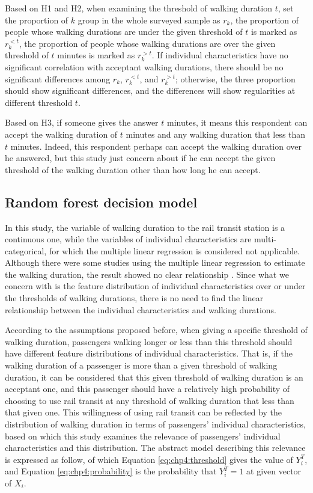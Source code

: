 Based on H1 and H2, when examining the threshold of walking duration $t$, set the proportion of $k$ group in the whole surveyed sample as $r_k$, the proportion of people whose walking durations are under the given threshold of $t$ is marked as $r_{k}^{<t}$, the proportion of people whose walking durations are over the given threshold of $t$ minutes is marked as $r_{k}^{>t}$. If individual characteristics have no significant correlation with acceptant walking durations, there should be no significant differences among $r_k$, $r_{k}^{<t}$, and $r_{k}^{>t}$; otherwise, the three proportion should show significant differences, and the differences will show regularities at different threshold $t$.

Based on H3, if someone gives the answer $t$ minutes, it means this respondent can accept the walking duration of $t$ minutes and any walking duration that less than $t$ minutes. Indeed, this respondent perhaps can accept the walking duration over he answered, but this study just concern about if he can accept the given threshold of the walking duration other than how long he can accept.

%
\subsection{Random forest decision model}
%
In this study, the variable of walking duration to the rail transit station is a continuous one, while the variables of individual characteristics are multi-categorical, for which the multiple linear regression is considered not applicable. Although there were some studies using the multiple linear regression to estimate the walking duration, the result showed no clear relationship \cite{krygsman2004multimodal}. Since what we concern with is the feature distribution of individual characteristics over or under the thresholds of walking durations, there is no need to find the linear relationship between the individual characteristics and walking durations.

%
According to the assumptions proposed before, when giving a specific threshold of walking duration, passengers walking longer or less than this threshold should have different feature distributions of individual characteristics. That is, if the walking duration of a passenger is more than a given threshold of walking duration, it can be considered that this given threshold of walking duration is an acceptant one, and this passenger should have a relatively high probability of choosing to use rail transit at any threshold of walking duration that less than that given one. This willingness of using rail transit can be reflected by the distribution of walking duration in terms of passengers' individual characteristics, based on which this study examines the relevance of passengers' individual characteristics and this distribution. The abstract model describing this relevance is expressed as follow, of which Equation \ref{eq:chp4:threshold} gives the value of $Y^T_i$, and Equation \ref{eq:chp4:probability} is the probability that $Y^T_i=1$ at given vector of $X_i$.

